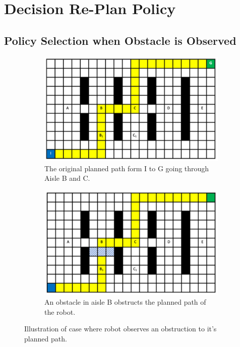 \documentclass[a4paper,12pt]{article}
\begin{document}
	\pagebreak
	
	\tableofcontents
	
	\pagebreak
	
	\section{Decision Re-Plan Policy}
	\label{sec:decisionReplanPolicy}
	
		\subsection{Policy Selection when Obstacle is Observed}
		\label{sec:policySelectionWhenObstacleIsObserved}
		
			\begin{figure}[H]
				\centering
				\begin{subfigure}{.4\textwidth}
					\centering
					\includegraphics[width=\linewidth]{originalPlannedPath.png}
					\caption{The original planned path form I to G going through Aisle B and C.}
					\label{fig:originalPlannedPath}
				\end{subfigure}
				\begin{subfigure}{.4\textwidth}
					\centering
					\includegraphics[width=\linewidth]{blockedAisleB.png}
					\caption{An obstacle in aisle B obstructs the planned path of the robot.}
					\label{fig:blockedAisleB}
				\end{subfigure}
				\caption{Illustration of case where robot observes an obstruction to it's planned path.}
				\label{fig:task1_1Figures}
			\end{figure}
			
\end{document}
